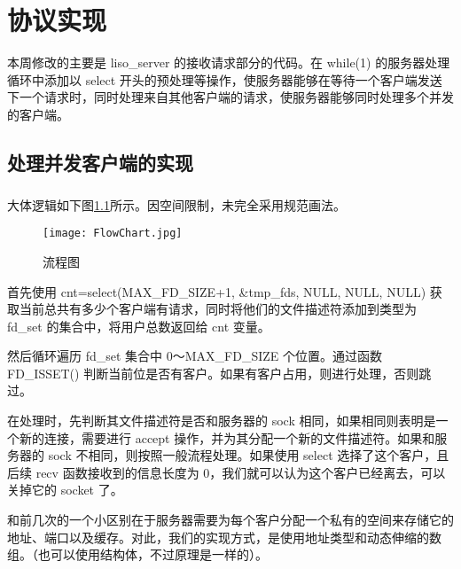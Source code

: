 
\chapter{协议实现}

本周修改的主要是 liso\_server 的接收请求部分的代码。在 while(1) 的服务器处理循环中添加以 select 开头的预处理等操作，使服务器能够在等待一个客户端发送下一个请求时，同时处理来自其他客户端的请求，使服务器能够同时处理多个并发的客户端。

\section{处理并发客户端的实现}


\paragraph*{}

大体逻辑如下图\ref{fig:flowchar}所示。因空间限制，未完全采用规范画法。

\begin{figure}[htbp!]
    \centering
    \texttt{[image: FlowChart.jpg]}
    \caption{流程图}\label{fig:flowchar}
\end{figure}


首先使用 cnt=select(MAX\_FD\_SIZE+1, \&tmp\_fds, NULL, NULL, NULL) 获取当前总共有多少个客户端有请求，同时将他们的文件描述符添加到类型为 fd\_set 的集合中，将用户总数返回给 cnt 变量。

然后循环遍历 fd\_set 集合中 0～MAX\_FD\_SIZE 个位置。通过函数 FD\_ISSET() 判断当前位是否有客户。如果有客户占用，则进行处理，否则跳过。

在处理时，先判断其文件描述符是否和服务器的 sock 相同，如果相同则表明是一个新的连接，需要进行 accept 操作，并为其分配一个新的文件描述符。如果和服务器的 sock 不相同，则按照一般流程处理。如果使用 select 选择了这个客户，且后续 recv 函数接收到的信息长度为 0，我们就可以认为这个客户已经离去，可以关掉它的 socket 了。

和前几次的一个小区别在于服务器需要为每个客户分配一个私有的空间来存储它的地址、端口以及缓存。对此，我们的实现方式，是使用地址类型和动态伸缩的数组。（也可以使用结构体，不过原理是一样的）。


